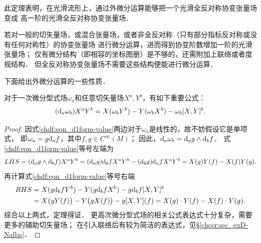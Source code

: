 \begin{remark}
    此定理表明，在光滑流形上，通过外微分运算能够把一个光滑{\kaishu 全反对称协变}张量场变成
    {\kaishu 高一阶}的光滑全反对称协变张量场．

    若对一般的切矢量场，或混合张量场，或者非全反对称（只有部分指标反对称或没有任何对称性）的协变张量场
    进行{\kaishu 微分}运算，进而得到协变阶数增加一阶的光滑张量场；
    仅有微分结构（即相容的坐标图册）是不够的，还需附加上联络或者度规结构．
    但{\kaishu 全反对称协变}张量场不需要这些结构便能进行{\kaishu 微分}运算．
\end{remark}

下面给出外微分运算的一些性质．


\begin{theorem}
对于一次微分型式场$\omega_a$和任意切矢量场$X^a,Y^b$，有如下重要公式：
\begin{equation}\label{chdf:eqn_d1form-value}
    ({\rm d}_a \omega_b) X^a Y^b = X(\omega_b Y^b)-Y(\omega_b X^b) -\omega_b [X,Y]^b .
\end{equation}
\end{theorem}
\begin{proof}
    因式\eqref{chdf:eqn_d1form-value}两边对于$\omega_a$是线性的，故不妨假设它是单项式，
       即$\omega_a = g {\rm d}_a f$，其中$f,g \in C^\infty(M)$；
    因此，${\rm d}_a \omega_b = {\rm d}_a g \wedge {\rm d}_b f$．
    式\eqref{chdf:eqn_d1form-value}等号左端为
    \begin{equation*}
        LHS = ({\rm d}_a g \wedge {\rm d}_b f)X^a Y^b
        = ({\rm d}_a g) {\rm d}_b f  X^a Y^b -({\rm d}_b g) {\rm d}_a f X^a Y^b
        = X(g)  Y(f) - X(f)  Y(g) .
    \end{equation*} %
    再计算式\eqref{chdf:eqn_d1form-value}等号右端
    \begin{align*}
        RHS &= X(g {\rm d}_b f  Y^b)-Y(g {\rm d}_b f X^b) - g {\rm d}_b f  [X,Y]^b \\
        &= X\bigl(g  Y(f)\bigr)-Y\bigl(g X(f)\bigr) - g  [X,Y](f)
        = X(g) \cdot Y(f) - X(f) \cdot Y(g) .
    \end{align*}
    综合以上两式，定理得证．
    更高次微分型式场的相关公式表达式十分复杂，需要更多的辅助切矢量场；
    在引入联络后有较为简洁的表达式，见\S \ref{chccr:sec_exD-Nalba}．
\end{proof}


